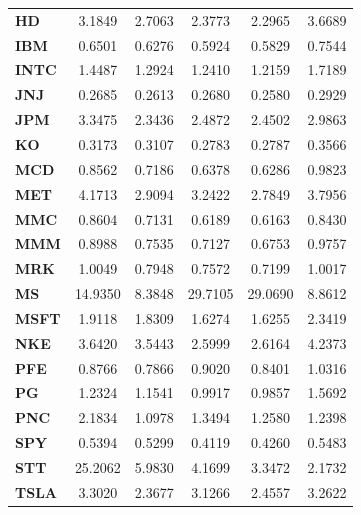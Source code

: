\documentclass[12pt,letterpaper]{article}
\begin{document}
\begin{enumerate}[label=\textbf{(\Alph*)}]
\begin{table}[ht]
{\begin{tabular}{lccccc}
	\textbf{HD}    & 3.1849       & 2.7063        & 2.3773       & 2.2965         & 3.6689      \\
	\textbf{IBM}   & 0.6501       & 0.6276        & 0.5924       & 0.5829         & 0.7544      \\
	\textbf{INTC}  & 1.4487       & 1.2924        & 1.2410       & 1.2159         & 1.7189      \\
	\textbf{JNJ}   & 0.2685       & 0.2613        & 0.2680       & 0.2580         & 0.2929      \\
	\textbf{JPM}   & 3.3475       & 2.3436        & 2.4872       & 2.4502         & 2.9863      \\
	\textbf{KO}    & 0.3173       & 0.3107        & 0.2783       & 0.2787         & 0.3566      \\
	\textbf{MCD}   & 0.8562       & 0.7186        & 0.6378       & 0.6286         & 0.9823      \\
	\textbf{MET}   & 4.1713       & 2.9094        & 3.2422       & 2.7849         & 3.7956      \\
	\textbf{MMC}   & 0.8604       & 0.7131        & 0.6189       & 0.6163         & 0.8430      \\
	\textbf{MMM}   & 0.8988       & 0.7535        & 0.7127       & 0.6753         & 0.9757      \\
	\textbf{MRK}   & 1.0049       & 0.7948        & 0.7572       & 0.7199         & 1.0017      \\
	\textbf{MS}    & 14.9350      & 8.3848        & 29.7105      & 29.0690        & 8.8612      \\
	\textbf{MSFT}  & 1.9118       & 1.8309        & 1.6274       & 1.6255         & 2.3419      \\
	\textbf{NKE}   & 3.6420       & 3.5443        & 2.5999       & 2.6164         & 4.2373      \\
	\textbf{PFE}   & 0.8766       & 0.7866        & 0.9020       & 0.8401         & 1.0316      \\
	\textbf{PG}    & 1.2324       & 1.1541        & 0.9917       & 0.9857         & 1.5692      \\
	\textbf{PNC}   & 2.1834       & 1.0978        & 1.3494       & 1.2580         & 1.2398      \\
	\textbf{SPY}   & 0.5394       & 0.5299        & 0.4119       & 0.4260         & 0.5483      \\
	\textbf{STT}   & 25.2062      & 5.9830        & 4.1699       & 3.3472         & 2.1732      \\
	\textbf{TSLA}  & 3.3020       & 2.3677        & 3.1266       & 2.4557         & 3.2622      \\

\end{tabular}}
\end{table}
\end{enumerate}
\end{document}
